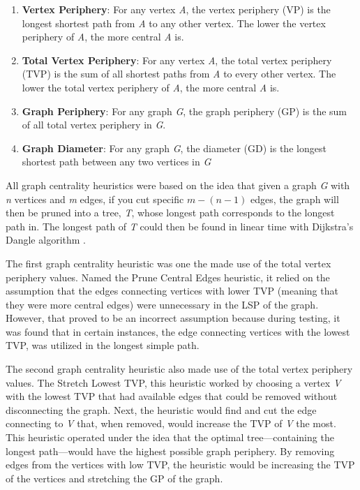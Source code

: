 \documentclass[twocolumn,showpacs,%
  nofootinbib,aps,superscriptaddress,%
  eqsecnum,prd,notitlepage,showkeys,11pt]{article}
\begin{document}
\begin{enumerate}
    \item \textbf{Vertex Periphery}: For any vertex \emph{A}, the vertex periphery (VP) is the longest shortest path from \emph{A} to any other vertex. The lower the vertex periphery of \emph{A}, the more central \emph{A} is.
    \item \textbf{Total Vertex Periphery}:  For any vertex \emph{A}, the total vertex periphery (TVP) is the sum of all shortest paths from \emph{A} to every other vertex. The lower the total vertex periphery of \emph{A}, the more central \emph{A} is.
    \item \textbf{Graph Periphery}: For any graph \emph{G}, the graph periphery (GP) is the sum of all total vertex periphery in \emph{G}.
    \item \textbf{Graph Diameter}: For any graph \emph{G}, the diameter (GD) is the longest shortest path between any two vertices in \emph{G}
\end{enumerate}

All graph centrality heuristics were based on the idea that given a graph \emph{G} with \emph{n} vertices and \emph{m} edges, if you cut specific \(m - (n - 1)\) edges, the graph will then be pruned into a tree, \emph{T}, whose longest path corresponds to the longest path in. The longest path of \emph{T} could then be found in linear time with Dijkstra's Dangle algorithm \cite{club2002computing}.

The first graph centrality heuristic was one the made use of the total vertex periphery values. Named the Prune Central Edges heuristic, it relied on the assumption that the edges connecting vertices with lower TVP (meaning that they were more central edges) were unnecessary in the LSP of the graph. However, that proved to be an incorrect assumption because during testing, it was found that in certain instances, the edge connecting vertices with the lowest TVP, was utilized in the longest simple path.

The second graph centrality heuristic also made use of the total vertex periphery values. The Stretch Lowest TVP, this heuristic worked by choosing a vertex \emph{V} with the lowest TVP that had available edges that could be removed without disconnecting the graph. Next, the heuristic would find and cut the edge connecting to \emph{V} that, when removed, would increase the TVP of \emph{V} the most. This heuristic operated under the idea that the optimal tree---containing the longest path---would have the highest possible graph periphery. By removing edges from the vertices with low TVP, the heuristic would be increasing the TVP of the vertices and stretching the GP of the graph.
\end{document}
